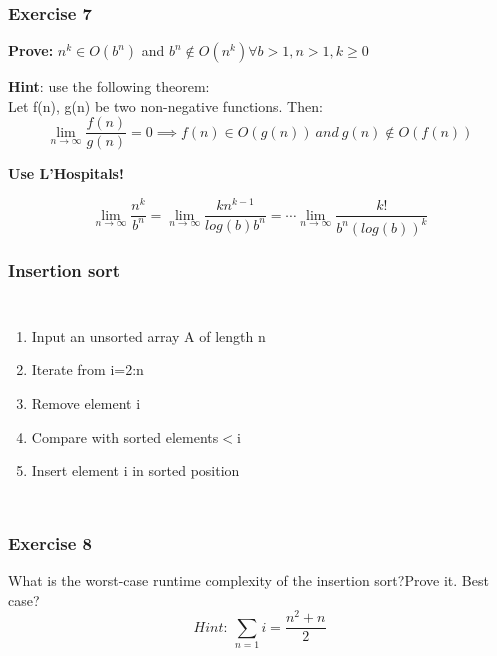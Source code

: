 \documentclass{beamer}
\begin{document}
\begin{frame}[noframenumbering]
\frametitle{Exercise 7}
\textbf{Prove:} $n^{k} \in O(b^{n})$ and $b^{n} 	\notin O(n^{k}) \forall b> 1, n>1, k\geq 0$ \\
 
 \begin{center}
{\color{blue} \textbf{Hint}: use the following theorem: \\

Let f(n), g(n) be two non-negative functions. Then: $$\lim_{n \to \infty} \frac{f(n)}{g(n)} = 0 \implies f (n) \in O(g(n)) \ and \ g(n) 	\notin O(f(n))$$ }
\end{center}
\textbf{Use L'Hospitals! }

$$\lim_{n \to \infty}  \frac{n^{k}}{b^{n}}= \lim_{n \to \infty}  \frac{kn^{k-1}}{log(b)b^{n}}
= \cdots \lim_{n \to \infty} \frac{k!} {b^{n}(log (b))^{k}}$$

\end{frame}

 

\begin{frame}
\frametitle{Insertion sort}

\begin{columns}[c]  
 
\begin{enumerate}
\item Input an unsorted array A of length n
\item Iterate from i=2:n
\item Remove element i
\item Compare with sorted elements$<$i
\item Insert element i in sorted position
\end{enumerate}

\end{columns}
 

\end{frame}





\begin{frame}
\frametitle{Exercise 8}
What is the worst-case runtime complexity of the insertion sort?Prove it. Best case?\\

{\color{blue}$$Hint: \ \sum_{n=1} i=\frac{n^{2}+n}{2}$$}
  
\end{frame}
\end{document}
